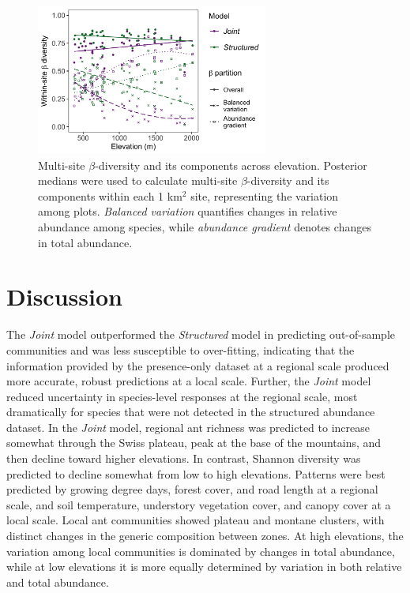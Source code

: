 \documentclass[preprint,final,times,12pt,3p]{elsarticle}
\begin{document}
\begin{figure}
\centering\includegraphics[width=3in]{../../../ms/1_Ecography/1/figs/beta_diversity.png}
\caption{\label{fig:beta_div} Multi-site $\beta$-diversity and its components across elevation. Posterior medians were used to calculate multi-site $\beta$-diversity and its components within each 1 km$^2$ site, representing the variation among plots. \emph{Balanced variation} quantifies changes in relative abundance among species, while \emph{abundance gradient} denotes changes in total abundance.}
\end{figure}


 




\section{Discussion}
\label{S:4}

The \emph{Joint} model outperformed the \emph{Structured} model in predicting out-of-sample communities and was less susceptible to over-fitting, indicating that the information provided by the presence-only dataset at a regional scale produced more accurate, robust predictions at a local scale. Further, the \emph{Joint} model reduced uncertainty in species-level responses at the regional scale, most dramatically for species that were not detected in the structured abundance dataset. In the \emph{Joint} model, regional ant richness was predicted to increase somewhat through the Swiss plateau, peak at the base of the mountains, and then decline toward higher elevations. In contrast, Shannon diversity was predicted to decline somewhat from low to high elevations. Patterns were best predicted by growing degree days, forest cover, and road length at a regional scale, and soil temperature, understory vegetation cover, and canopy cover at a local scale. Local ant communities showed plateau and montane clusters, with distinct changes in the generic composition between zones. At high elevations, the variation among local communities is dominated by changes in total abundance, while at low elevations it is more equally determined by variation in both relative and total abundance.
\end{document}
